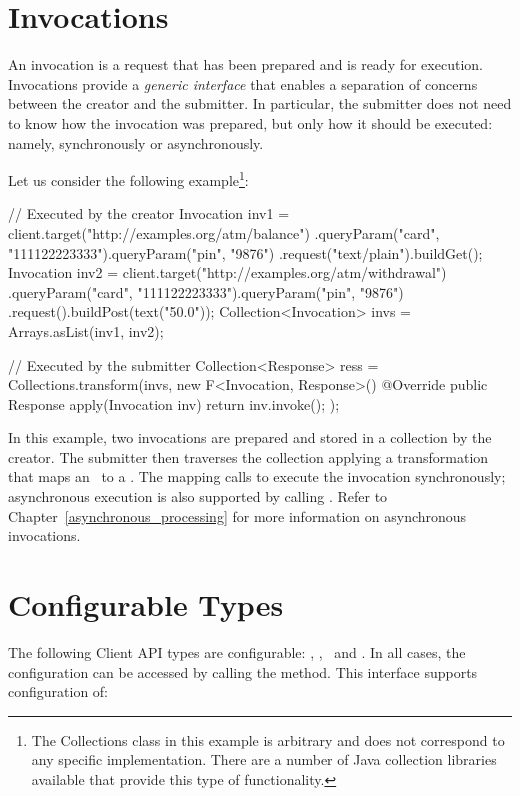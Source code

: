 \section{Invocations}
\label{invocations}

An invocation is a request that has been prepared and is ready for execution. Invocations provide a {\em generic interface} that enables a separation of concerns between the creator and the submitter. In particular, the submitter does not need to know how the invocation was prepared, but only how it should be executed: namely, synchronously or asynchronously.

 Let us consider the following example\footnote{The Collections class in this example is arbitrary and does not correspond to any specific implementation. There are a number of Java collection libraries available that provide this type of functionality.}:

\begin{listing}{1}
// Executed by the creator
Invocation inv1 = client.target("http://examples.org/atm/balance")
    .queryParam("card", "111122223333").queryParam("pin", "9876")
    .request("text/plain").buildGet();
Invocation inv2 = client.target("http://examples.org/atm/withdrawal")
    .queryParam("card", "111122223333").queryParam("pin", "9876")
    .request().buildPost(text("50.0"));
Collection<Invocation> invs = Arrays.asList(inv1, inv2);

// Executed by the submitter
Collection<Response> ress =
    Collections.transform(invs,
        new F<Invocation, Response>() {
             @Override
             public Response apply(Invocation inv) {
                 return inv.invoke(); } });
\end{listing}

In this example, two invocations are prepared and stored in a collection by the creator. The submitter then traverses the collection applying a transformation that maps an \Invocation\ to a \Response. The mapping calls  to execute the invocation synchronously; asynchronous execution is also supported by calling . Refer to
Chapter~\ref{asynchronous_processing} for more information on asynchronous invocations.

\section{Configurable Types}
\label{configurable_types}

The following Client API types are configurable: \Client, \Invocation, \InvocationBuilder\ and \WebTarget. In all cases, the configuration can be accessed by calling the  method. This interface supports configuration of:

